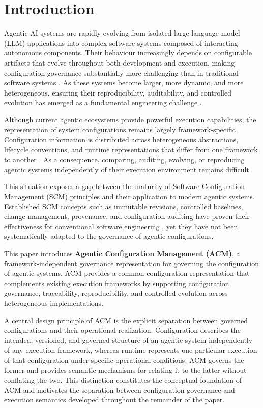 \documentclass[10pt]{article}
\begin{document}
\section{Introduction}
\label{sec:introduction}
Agentic AI systems are rapidly evolving from isolated large language model (LLM) applications into complex software systems composed of interacting autonomous components. Their behaviour increasingly depends on configurable artifacts that evolve throughout both development and execution, making configuration governance substantially more challenging than in traditional software systems \cite{bersoff1978software, bersoff1984elements, whitgift1991methods}. As these systems become larger, more dynamic, and more heterogeneous, ensuring their reproducibility, auditability, and controlled evolution has emerged as a fundamental engineering challenge \cite{Hughes03072025, pandey2025agentic}.

Although current agentic ecosystems provide powerful execution capabilities, the representation of system configurations remains largely framework-specific \cite{bandi2025rise}. Configuration information is distributed across heterogeneous abstractions, lifecycle conventions, and runtime representations that differ from one framework to another \cite{acharya2025agentic, Inioluwa2020}. As a consequence, comparing, auditing, evolving, or reproducing agentic systems independently of their execution environment remains difficult.

This situation exposes a gap between the maturity of Software Configuration Management (SCM) principles and their application to modern agentic systems. Established SCM concepts such as immutable revisions, controlled baselines, change management, provenance, and configuration auditing have proven their effectiveness for conventional software engineering \cite{ieee2012ieee, leon2015software, amershi2019}, yet they have not been systematically adapted to the governance of agentic configurations.

This paper introduces \textbf{Agentic Configuration Management (ACM)}, a framework-independent governance representation for governing the configuration of agentic systems. ACM provides a common configuration representation that complements existing execution frameworks by supporting configuration governance, traceability, reproducibility, and controlled evolution across heterogeneous implementations.

A central design principle of ACM is the explicit separation between governed configurations and their operational realization. Configuration describes the intended, versioned, and governed structure of an agentic system independently of any execution framework, whereas runtime represents one particular execution of that configuration under specific operational conditions. ACM governs the former and provides semantic mechanisms for relating it to the latter without conflating the two. This distinction constitutes the conceptual foundation of ACM and motivates the separation between configuration governance and execution semantics developed throughout the remainder of the paper.
\end{document}
